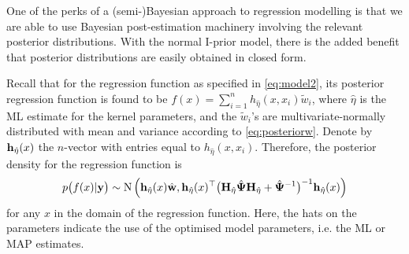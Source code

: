 One of the perks of a (semi-)Bayesian approach to regression modelling is that we are able to use Bayesian post-estimation machinery involving the relevant posterior distributions.
With the normal I-prior model, there is the added benefit that posterior distributions are easily obtained in closed form.

Recall that for the regression function as specified in \eqref{eq:model2}, its posterior regression function is found to be $f(x) = \sum_{i=1}^n h_{\hat\eta}(x,x_i)\tilde w_i$, where $\hat\eta$ is the ML estimate for the kernel parameters, and the $\tilde w_i$'s are multivariate-normally distributed with mean and variance according to \eqref{eq:posteriorw}.
Denote by ${\mathbf h}_{\hat\eta}(x)$ the $n$-vector with entries equal to $h_{\hat\eta}(x,x_i)$.
Therefore, the posterior density for the regression function is
\begin{align}
  p\big(f(x) | {\mathbf y} \big) \sim \operatorname{N} \Big( 
  {\mathbf h}_{\hat\eta}(x)\hat{{\mathbf w}}, 
  {\mathbf h}_{\hat\eta}(x)^\top \big({\mathbf H}_{\hat\eta}\hat{{\bm\Psi}}{\mathbf H}_{\hat\eta} + \hat{{\bm\Psi}}^{-1}\big)^{-1} {\mathbf h}_{\hat\eta}(x) 
  \Big)
\end{align}
for any $x$ in the domain of the regression function.
Here, the hats on the parameters indicate the use of the optimised model parameters, i.e. the ML or MAP estimates.

